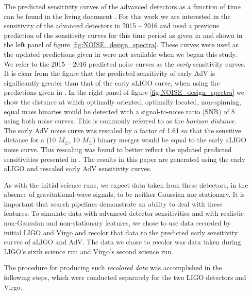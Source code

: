 The predicted sensitivity curves of the advanced detectors as a function of
time can be found in the living document
\cite{Aasi:2013wya}. For this work we are interested in the
sensitivity of the advanced detectors in 2015 -- 2016 and used a previous 
prediction of the sensitivity curves for this time period as given in
\cite{LV_early_noisecurves} and shown in the left panel of figure 
\ref{fig:NOISE_design_spectra}.
These curves were used as the updated predictions given in 
\cite{Aasi:2013wya} were not available when we began this study.
We refer to the 2015 -- 2016 predicted noise curves as the \emph{early} 
sensitivity curves.
It is clear from the figure that the predicted
sensitivity of early AdV is significantly greater than 
that of the early aLIGO curve, when using the predictions given in 
\cite{LV_early_noisecurves}. In the right panel of figure 
\ref{fig:NOISE_design_spectra} we
show the distance at which optimally oriented, optimally located,
non-spinning, equal mass binaries would be detected with a
signal-to-noise ratio (SNR) of 8 using both noise curves.
This is commonly referred to as the \emph{horizon distance}. The early AdV 
noise curve was rescaled
by a factor of 1.61 so that the sensitive distance for a
(10 $M_{\odot}$, 10 $M_{\odot}$) binary merger would be equal to the early aLIGO
noise curve. This rescaling was found to better reflect the updated predicted
sensitivities presented in \cite{Aasi:2013wya}. The results in this 
paper are generated using the early aLIGO and rescaled early AdV sensitivity 
curves.

As with the initial science runs, we expect data taken from
these detectors, in the absence of gravitational-wave signals, to be neither
Gaussian nor stationary. It is important that search pipelines demonstrate
an ability to deal with these features. To simulate data with 
advanced detector sensitivities and with
realistic non-Gaussian and non-stationary features, we chose to use
data recorded by initial LIGO and Virgo and recolor that data to the
predicted early sensitivity curves of aLIGO and AdV. The data we
chose to recolor was data taken during LIGO's sixth science run and Virgo's
second science run.

The procedure for producing such \emph{recolored data} was accomplished in the
following steps, which were conducted separately for the two LIGO detectors and
Virgo.

